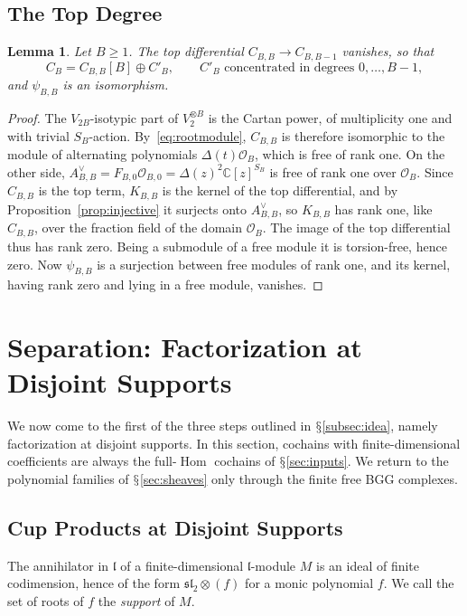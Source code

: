 \documentclass[11pt]{amsart}
\numberwithin{equation}{section}
\renewcommand{\S}{\mbox{$\mathsection$}}
\newtheorem{lemma}[theorem]{Lemma}
\theoremstyle{definition}
\theoremstyle{remark}
\newcommand{\C}{\mathbb{C}}
\newcommand{\sltwo}{\mathfrak{sl}_2}
\newcommand{\lie}{\mathfrak{l}}
\newcommand{\cO}{\mathcal{O}}
\newcommand{\Hom}{\operatorname{Hom}}
\begin{document}
\subsection{The Top Degree}
\begin{lemma}\label{lem:top}
Let $B\ge1$. The top differential $C_{B,B}\to C_{B,B-1}$ vanishes, so that
\begin{equation}\label{eq:CB-split}
C_B=C_{B,B}[B]\oplus C'_B,\qquad C'_B\text{ concentrated in degrees }0,\dots,B-1,
\end{equation}
and $\psi_{B,B}$ is an isomorphism.
\end{lemma}

\begin{proof}
The $V_{2B}$-isotypic part of $V_2^{\otimes B}$ is the Cartan power, of multiplicity one and with trivial $S_B$-action. By~\eqref{eq:rootmodule}, $C_{B,B}$ is therefore isomorphic to the module of alternating polynomials $\Delta(t)\cO_B$, which is free of rank one. On the other side, $A^\vee_{B,B}=F_{B,0}\cO_{B,0}=\Delta(z)^2\C[z]^{S_B}$ is free of rank one over $\cO_B$. Since $C_{B,B}$ is the top term, $K_{B,B}$ is the kernel of the top differential, and by Proposition~\ref{prop:injective} it surjects onto $A^\vee_{B,B}$, so $K_{B,B}$ has rank one, like $C_{B,B}$, over the fraction field of the domain $\cO_B$. The image of the top differential thus has rank zero. Being a submodule of a free module it is torsion-free, hence zero. Now $\psi_{B,B}$ is a surjection between free modules of rank one, and its kernel, having rank zero and lying in a free module, vanishes.
\end{proof}

\section{Separation: Factorization at Disjoint Supports}\label{sec:separation}

We now come to the first of the three steps outlined in \S\ref{subsec:idea}, namely factorization at disjoint supports. In this section, cochains with finite-dimensional coefficients are always the full-$\Hom$ cochains of \S\ref{sec:inputs}. We return to the polynomial families of \S\ref{sec:sheaves} only through the finite free BGG complexes.

\subsection{Cup Products at Disjoint Supports}
The annihilator in $\lie$ of a finite-dimensional $\lie$-module $M$ is an ideal of finite codimension, hence of the form $\sltwo\otimes(f)$ for a monic polynomial $f$. We call the set of roots of $f$ the \emph{support} of $M$.
\end{document}
